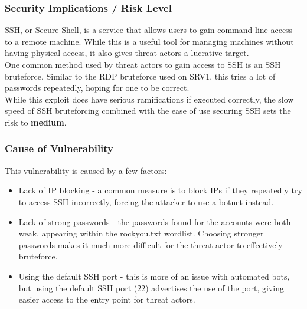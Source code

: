 \documentclass{report}
\begin{document}
\subsubsection{Security Implications / Risk Level}
SSH, or Secure Shell, is a service that allows users to gain command line access to a remote machine. While this is a useful tool for managing machines without having physical access, it also gives threat actors a lucrative target.\\
One common method used by threat actors to gain access to SSH is an SSH bruteforce. Similar to the RDP bruteforce used on SRV1, this tries a lot of passwords repeatedly, hoping for one to be correct.\\
While this exploit does have serious ramifications if executed correctly, the slow speed of SSH bruteforcing combined with the ease of use securing SSH sets the risk to \textbf{medium}.
\subsubsection{Cause of Vulnerability}
This vulnerability is caused by a few factors:
\begin{itemize}
	\item Lack of IP blocking - a common measure is to block IPs if they repeatedly try to access SSH incorrectly, forcing the attacker to use a botnet instead.
	\item Lack of strong passwords - the passwords found for the accounts were both weak, appearing within the rockyou.txt wordlist. Choosing stronger passwords makes it much more difficult for the threat actor to effectively bruteforce.
	\item Using the default SSH port - this is more of an issue with automated bots, but using the default SSH port (22) advertises the use of the port, giving easier access to the entry point for threat actors.
\end{itemize}
\end{document}
